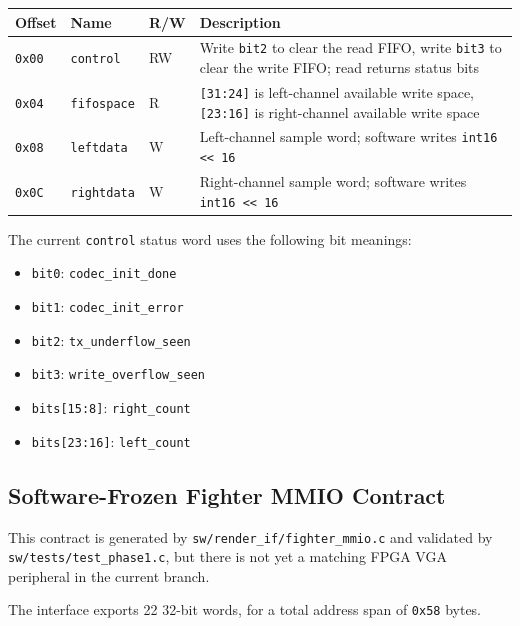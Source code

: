 \documentclass[12pt,a4paper]{article}
\begin{document}
\begin{longtable}{>{\raggedright\arraybackslash}p{} >{\raggedright\arraybackslash}p{} >{\raggedright\arraybackslash}p{} >{\raggedright\arraybackslash}p{}}
\toprule
Offset & Name & R/W & Description \\
\midrule
\endhead
\texttt{0x00} & \texttt{control} & RW & Write \texttt{bit2} to clear the read FIFO, write \texttt{bit3} to clear the write FIFO; read returns status bits \\
\texttt{0x04} & \texttt{fifospace} & R & \texttt{[31:24]} is left-channel available write space, \texttt{[23:16]} is right-channel available write space \\
\texttt{0x08} & \texttt{leftdata} & W & Left-channel sample word; software writes \texttt{int16 << 16} \\
\texttt{0x0C} & \texttt{rightdata} & W & Right-channel sample word; software writes \texttt{int16 << 16} \\
\bottomrule
\end{longtable}

\noindent The current \texttt{control} status word uses the following bit meanings:

\begin{itemize}
  \item \texttt{bit0}: \texttt{codec\_init\_done}
  \item \texttt{bit1}: \texttt{codec\_init\_error}
  \item \texttt{bit2}: \texttt{tx\_underflow\_seen}
  \item \texttt{bit3}: \texttt{write\_overflow\_seen}
  \item \texttt{bits[15:8]}: \texttt{right\_count}
  \item \texttt{bits[23:16]}: \texttt{left\_count}
\end{itemize}

\subsection{Software-Frozen Fighter MMIO Contract}

This contract is generated by \texttt{sw/render\_if/fighter\_mmio.c} and validated by \texttt{sw/tests/test\_phase1.c}, but there is not yet a matching FPGA VGA peripheral in the current branch.

The interface exports 22 32-bit words, for a total address span of \texttt{0x58} bytes.
\end{document}
